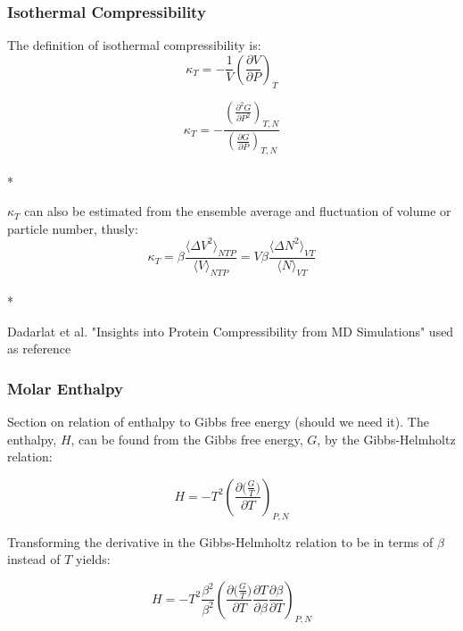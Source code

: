 \documentclass[a4paper,12pt]{article}
\begin{document}
\subsubsection{Isothermal Compressibility}
The definition of isothermal compressibility is:
\begin{equation}\kappa_T = -\frac{1}{V} \left(\frac{\partial V}{\partial P}\right)_T \end{equation}

\begin{equation}\kappa_T = -\frac{\left(\frac{\partial^2 G}{\partial P^2}\right)_{T, N}}{\left(\frac{\partial G}{\partial P}\right)_{T, N}}\end{equation}\\*

$\kappa_T$ can also be estimated from the ensemble average and fluctuation of volume or particle number, thusly:
\begin{equation}\kappa_T = \beta \frac{\langle \Delta V^2 \rangle_{NTP}}{\langle V \rangle_{NTP}} = V \beta \frac{\langle \Delta N^2 \rangle_{VT}}{\langle N \rangle_{VT}}\end{equation}\\*

Dadarlat et al. "Insights into Protein Compressibility from MD Simulations" used as reference




\subsubsection{Molar Enthalpy}
Section on relation of enthalpy to Gibbs free energy (should we need it).
The enthalpy, $H$, can be found from the Gibbs free energy, $G$, by the Gibbs-Helmholtz relation: 

\begin{equation}H=-T^2 \left(\frac{\partial \big(\frac{G}{T}\big)}{\partial T}\right)_{P,N}\end{equation}

Transforming the derivative in the Gibbs-Helmholtz relation to be in terms of $\beta$ instead of $T$ yields:

\begin{equation}H=-T^2  \frac{\beta^2}{\beta^2}\left(\frac{\partial \big(\frac{G}{T}\big)}{\partial T} \frac{\partial T}{\partial \beta} \frac{\partial \beta}{\partial T}\right)_{P,N}\end{equation}
\end{document}
